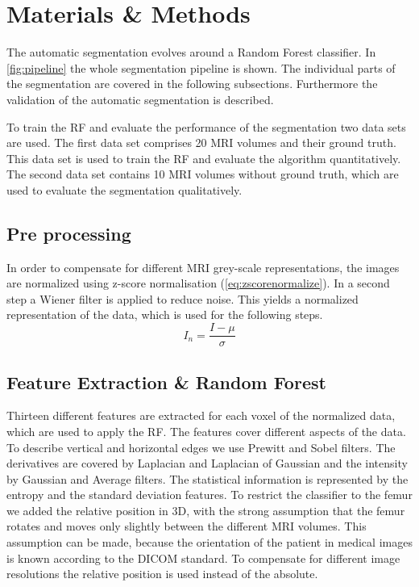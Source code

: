 \section{Materials \& Methods}
The automatic segmentation evolves around a Random Forest classifier. In \autoref{fig:pipeline} the whole segmentation pipeline is shown. The individual parts of the segmentation are covered in the following subsections. Furthermore the validation of the automatic segmentation is described.

To train the RF and evaluate the performance of the segmentation two data sets are used. The first data set comprises 20 MRI volumes and their ground truth. This data set is used to train the RF and evaluate the algorithm quantitatively. The second data set contains 10 MRI volumes without ground truth, which are used to evaluate the segmentation qualitatively.
\subsection{Pre processing}
In order to compensate for different MRI grey-scale representations, the images are normalized using z-score normalisation (\autoref{eq:zscorenormalize}). In a second step a Wiener filter is applied to reduce noise. This yields a normalized representation of the data, which is used for the following steps.
\begin{equation}
I_n = \frac{I - \mu}{\sigma}
\label{eq:zscorenormalize}
\end{equation}
\subsection{Feature Extraction \& Random Forest}
Thirteen different features are extracted for each voxel of the normalized data, which are used to apply the RF. The features cover different aspects of the data. To describe vertical and horizontal edges we use Prewitt and Sobel filters. The derivatives are covered by Laplacian and Laplacian of Gaussian and the intensity by Gaussian and Average filters. The statistical information is represented by the entropy and the standard deviation features. To restrict the classifier to the femur we added the relative position in 3D, with the strong assumption that the femur rotates and moves only slightly between the different MRI volumes. This assumption can be made, because the orientation of the patient in medical images is known according to the DICOM standard\cite{dicom-orientation}. To compensate for different image resolutions the relative position is used instead of the absolute.

